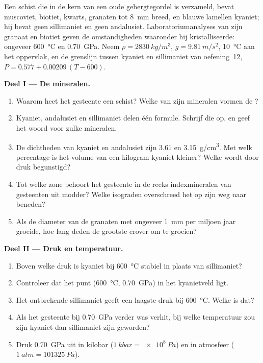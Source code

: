 \begin{problem}
\label{pb:g12:metamorphic-rocks:1}
Een schist die in de kern van een oude gebergtegordel is verzameld, bevat muscoviet,
biotiet, kwarts, granaten tot \qty{8}{mm} breed, en blauwe lamellen
kyaniet; hij bevat geen sillimaniet en geen andalusiet. Laboratoriumanalyses van
zijn granaat en biotiet geven de omstandigheden waaronder hij kristalliseerde:
ongeveer \qty{600}{\celsius} en \qty{0.70}{GPa}. Neem $\rho =
\qty{2830}{kg/m^3}$, $g = \qty{9.81}{m/s^2}$, \qty{10}{\celsius} aan het
oppervlak, en de grenslijn tussen kyaniet en sillimaniet van oefening~12, $P = 0.577 +
0.00209\,(T - 600)$.

\medskip
\noindent\textbf{Deel I --- De mineralen.}
\begin{enumerate}
  \item Waarom heet het gesteente een schist? Welke van zijn mineralen vormen de
        ?
  \item Kyaniet, andalusiet en sillimaniet delen één formule. Schrijf die op, en
        geef het woord voor zulke mineralen.
  \item De dichtheden van kyaniet en andalusiet zijn \num{3.61} en
        \qty{3.15}{g/cm^3}. Met welk percentage is het volume van een kilogram
        kyaniet kleiner? Welke wordt door druk begunstigd?
  \item Tot welke zone behoort het gesteente in de reeks indexmineralen van gesteenten uit modder? Welke isograden overschreed het op zijn weg naar beneden?
  \item Als de diameter van de granaten met ongeveer \qty{1}{mm} per miljoen
        jaar groeide, hoe lang deden de grootste erover om te groeien?
\end{enumerate}

\medskip
\noindent\textbf{Deel II --- Druk en temperatuur.}
\begin{enumerate}[resume]
  \item Boven welke druk is kyaniet bij \qty{600}{\celsius} stabiel in plaats
        van sillimaniet?
  \item Controleer dat het punt (\qty{600}{\celsius}, \qty{0.70}{GPa}) in
        het kyanietveld ligt.
  \item Het ontbrekende sillimaniet geeft een laagste druk bij
        \qty{600}{\celsius}. Welke is dat?
  \item Als het gesteente bij \qty{0.70}{GPa} verder was verhit, bij welke
        temperatuur zou zijn kyaniet dan sillimaniet zijn geworden?
  \item Druk \qty{0.70}{GPa} uit in kilobar ($\qty{1}{kbar} =
        \qty{e8}{Pa}$) en in atmosfeer ($\qty{1}{atm} = \qty{101325}{Pa}$).
\end{enumerate}


\end{problem}
